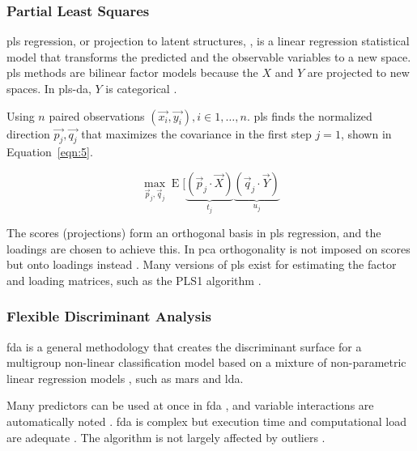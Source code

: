 \documentclass[sn-mathphys-num]{sn-jnl}%
\begin{document}
\subsubsection{Partial Least Squares}

\acrfull{pls} regression, or projection to latent structures, \cite{wold2001pls, abdi2010partial}, is a linear regression statistical model that transforms the predicted and the observable variables to a new space. \acrshort{pls} methods are bilinear factor models because the $X$ and $Y$ are projected to new spaces. In \acrfull{pls-da}, $Y$ is categorical \cite{saebo2008lpls}.

Using $n$ paired observations $\left(\vec{x_{i}}, \vec{y_{i}}\right), i \in 1, \dots, n$. \acrshort{pls} finds the normalized direction $\vec{p_{j}}, \vec{q_{j}}$ that maximizes the covariance in the first step $j = 1$, shown in Equation~\ref{eqn:5}.

\begin{equation}
	\max_{{\vec{p}}_{j},{\vec{q}}_{j}}\operatorname{E} [\underbrace{({\vec{p}}_{j}\cdot {\vec{X}})}_{t_{j}}\underbrace{({\vec{q}}_{j}\cdot {\vec{Y}})}_{u_{j}}
	\label{eqn:5}
\end{equation}

The scores (projections) form an orthogonal basis in \acrshort{pls} regression, and the loadings are chosen to achieve this. In \acrshort{pca} orthogonality is not imposed on scores \cite{lindgren1993kernel} but onto loadings instead \cite{de1994comments, dayal1997improved}. Many versions of \acrshort{pls} exist \cite{de1993simpls, rannar1994pls} for estimating the factor and loading matrices, such as the PLS1 algorithm \cite{takane2016pls, hoskuldsson1988pls}. 

\subsubsection{Flexible Discriminant Analysis}

\acrfull{fda} is a general methodology that creates the discriminant surface for a multigroup non-linear classification model  \cite{fisher1936use, mclachlan2005discriminant} based on a mixture of non-parametric linear regression models \cite{hastie1995penalized}, such as \acrfull{mars} and \acrfull{lda}.

Many predictors can be used at once in \acrshort{fda} \cite{HastieTibshirani2009}, and variable interactions are automatically noted \cite{hastie1994flexible}. \acrshort{fda} is complex but execution time and computational load are adequate \cite{reynes2006choice}. The algorithm is not largely affected by outliers \cite{phillips2017applying}.
\end{document}
